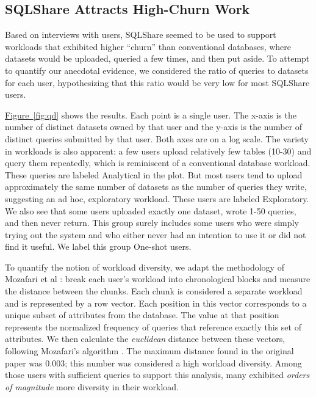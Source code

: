 \documentclass{sig-alternate}
\newcommand{\note}[2]{{\color{#1} {#2}}}
\newcommand{\reviewone}[1]{\note{black}{#1}}
\newcommand{\figref}[1]{\hyperref[#1]{Figure~\ref*{#1}}}
\newcommand{\sqlshare}{SQLShare}
\begin{document}
\subsection{\sqlshare{} Attracts High-Churn Work}
\reviewone{Based on interviews with users, \sqlshare{} seemed to be used to support workloads that exhibited higher ``churn'' than conventional databases, where datasets would be uploaded, queried a few times, and then put aside.  
To attempt to quantify our anecdotal evidence, we considered the ratio of queries to datasets for each user, hypothesizing that this ratio would be very low for most \sqlshare{} users.

\figref{fig:qd} shows the results. Each point is a single user.
The x-axis is the number of distinct datasets owned by that user and the y-axis is the 
number of distinct queries submitted by that user.  Both axes are on a log scale.
The variety in workloads is also apparent: a few users upload relatively few tables (10-30) and query them repeatedly,
which is reminiscent of a conventional database workload.  These queries are labeled \textsf{Analytical} in the plot.
But most users tend to upload approximately the same number of datasets as the number of queries they write, suggesting an ad hoc, exploratory workload.  These users are labeled \textsf{Exploratory}.  We also see that some users uploaded exactly one dataset, wrote 1-50 queries, and then never return.  This group surely includes some users who were simply trying out the system and who either never had an intention to use it or did not find it useful.  We label this group \textsf{One-shot users}.

To quantify the notion of workload diversity, we adapt the methodology of Mozafari et al \cite{mozafari2015cliffguard}: break each user's workload into chronological blocks and measure the distance between the chunks. Each chunk is considered a separate workload and is represented by a row vector. Each position in this vector corresponds to a unique subset of attributes from the database. The value at that position represents the normalized frequency of queries that reference exactly this set of attributes. We then calculate the \emph{euclidean} distance between these vectors, following Mozafari's algorithm \cite{mozafari2015cliffguard}. The maximum distance found in the original paper was $0.003$; this number was considered a high workload diversity. Among those users with sufficient queries to support this analysis, many exhibited \emph{orders of magnitude} more diversity in their workload.}
\end{document}
